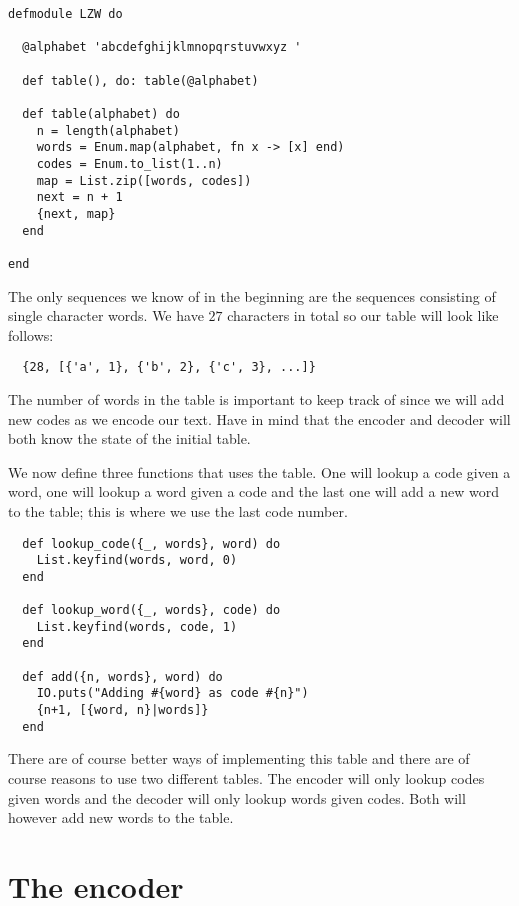 \documentclass[a4paper,11pt]{article}
\begin{document}
\begin{verbatim}
defmodule LZW do

  @alphabet 'abcdefghijklmnopqrstuvwxyz '

  def table(), do: table(@alphabet)

  def table(alphabet) do
    n = length(alphabet)
    words = Enum.map(alphabet, fn x -> [x] end)
    codes = Enum.to_list(1..n)
    map = List.zip([words, codes])
    next = n + 1
    {next, map}
  end

end
\end{verbatim}

The only sequences we know of in the beginning are the sequences
consisting of single character words. We have $27$ characters in total so
our table will look like follows:

\begin{verbatim}
  {28, [{'a', 1}, {'b', 2}, {'c', 3}, ...]}
\end{verbatim}

The number of words in the table is important to keep track of
since we will add new codes as we encode our text. Have in mind that
the encoder and decoder will both know the state of the initial table.

We now define three functions that uses the table. One will lookup a
code given a word, one will lookup a word given a code and the last
one will add a new word to the table; this is where we use the last
code number.

\begin{verbatim}
  def lookup_code({_, words}, word) do
    List.keyfind(words, word, 0)
  end

  def lookup_word({_, words}, code) do
    List.keyfind(words, code, 1)
  end

  def add({n, words}, word) do
    IO.puts("Adding #{word} as code #{n}")
    {n+1, [{word, n}|words]}
  end
\end{verbatim}

There are of course better ways of implementing this table and there
are of course reasons to use two different tables. The encoder will
only lookup codes given words and the decoder will only lookup words
given codes. Both will however add new words to the table. 



\section{The encoder}
\end{document}
